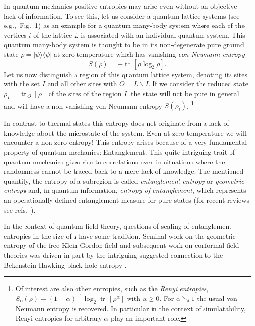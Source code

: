 \documentclass[12pt,rmp,floatfix,epsfig,graphics]{revtex4} %
\DeclareMathOperator{\tr}{tr\,}
\begin{document}
In quantum mechanics positive entropies may arise even without an 
objective lack of information. To see this, let us consider a 
quantum lattice systems (see e.g.,\ Fig.\ 1) as an example for a 
quantum many-body system where each of the vertices $i$ of 
the lattice $L$ is associated with an individual quantum system. 
This quantum many-body system is thought to be in its non-degenerate 
pure ground state $\rho=|\psi\rangle\langle\psi|$ at zero temperature
which has vanishing {\it von-Neumann entropy} 
\begin{equation*}
        S(\rho) = - \tr[\rho \log_2 \rho].
\end{equation*}
Let us now distinguish a region of this quantum lattice 
system, denoting its sites with the set $I$ and all other 
sites with $O=L\backslash I$. If we consider the reduced state 
$\rho_I= \tr_{O}[\rho]$ of the sites of the region $I$, 
the state will not be pure in general and will have a 
non-vanishing von-Neumann entropy $S(\rho_I)$.
\footnote{Of interest are also other entropies, such as the 
{\it Renyi entropies}, $S_\alpha(\rho) =(1-\alpha)^{-1} 
\log_2 \tr [\rho^\alpha]$ with $\alpha\geq 0$. For 
$\alpha\searrow 1$ the usual von-Neumann entropy is recovered. 
In particular in the context of simulatability, Renyi entropies 
for arbitrary $\alpha$ play an important role.}

In contrast to thermal states this entropy does not originate 
from a lack of knowledge about the microstate of the system. 
Even at zero temperature we will encounter a non-zero 
entropy! This entropy arises because of a very fundamental property 
of quantum mechanics: Entanglement. This quite intriguing 
trait of quantum mechanics gives rise to correlations even
in situations where the randomness cannot be traced back 
to a mere lack of knowledge. The mentioned quantity, the entropy 
of a subregion is called {\it entanglement entropy} or  
{\it geometric entropy} and, in quantum information,
{\it entropy of entanglement}, which 
 represents an operationally defined entanglement 
measure for pure states (for recent reviews see refs.\ \cite{Horodecki,InHouseReview}).

In the context of quantum field theory, questions of scaling
of entanglement entropies  in the size of $I$ have some tradition. Seminal work on the 
geometric entropy of the free Klein-Gordon field 
\cite{Bombelli,Srednicki} and subsequent work on conformal field
theories \cite{Larsen,Callan,PreskillOld,Calabrese,HardStuff} was 
driven in part by the intriguing suggested connection to the 
Bekenstein-Hawking black hole entropy 
\cite{Bekenstein,Hawking74,BekensteinCP}. 
\end{document}
